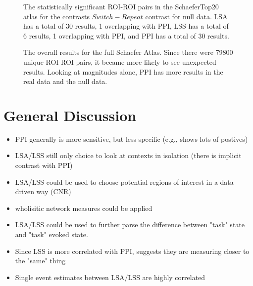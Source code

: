 \documentclass[phd,appendix,figures]{uithesis}
\begin{document}
\begin{figure}[H]
  \ContinuedFloat
  \centering


  \caption{
      The statistically significant ROI-ROI pairs in the SchaeferTop20 atlas
      for the contrasts $Switch - Repeat$ contrast for null data.
      LSA has a total of 30 results, 1 overlapping with PPI,
      LSS has a total of 6 results, 1 overlapping with PPI,
      and PPI has a total of 30 results.
  }
  \label{fig:data-null_type-brain_atlas-schaeferbest_contrast-switchxrepeat}
\end{figure}

\begin{figure}[H]
  \centering


  \caption{
      The overall results for the full Schaefer Atlas.
      Since there were 79800 unique ROI-ROI pairs, it became more likely
      to see unexpected results.
      Looking at magnitudes alone, PPI has more results in the real data
      and the null data.
  }
  \label{fig:schaefer_binomial_ppi}
\end{figure}

\chapter{General Discussion}

\begin{itemize}
	\item PPI generally is more sensitive, but less specific (e.g., shows lots of postives)
	\item LSA/LSS still only choice to look at contexts in isolation (there is implicit contrast with PPI)
	\item LSA/LSS could be used to choose potential regions of interest in a data driven way (CNR)
	\item wholisitic network measures could be applied
	\item LSA/LSS could be used to further parse the difference between "task" state and "task" evoked state.
	\item Since LSS is more correlated with PPI, suggests they are measuring closer to the "same" thing
	\item Single event estimates between LSA/LSS are highly correlated
\end{itemize}
\appendix
\end{document}

